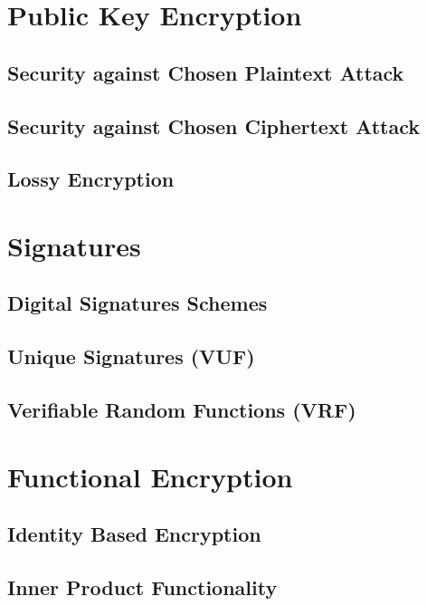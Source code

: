 \chapter{Public Key Encryption}
	\section{Security against Chosen Plaintext Attack}
	
	

	\section{Security against Chosen Ciphertext Attack}
	
	
	\section{Lossy Encryption}
	

\chapter{Signatures}
	\section{Digital Signatures Schemes}
	
	
	
	\section{Unique Signatures (VUF)}
	
	\section{Verifiable Random Functions (VRF)}
	
	
	
\chapter{Functional Encryption}
	\section{Identity Based Encryption}
	
	
	
	\section{Inner Product Functionality}
	
	
	
	
